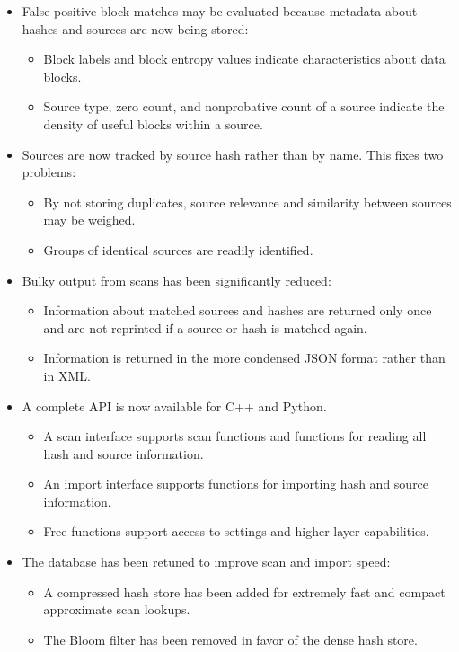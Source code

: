 \documentclass[11pt,fleqn]{article} %
\begin{document}
\begin{itemize}
\item False positive block matches may be evaluated because metadata about hashes and sources are now being stored:
  \begin{itemize}
  \item Block labels and block entropy values indicate characteristics about data blocks.
  \item Source type, zero count, and nonprobative count of a source indicate the density of useful blocks within a source.
\end{itemize}
\item Sources are now tracked by source hash rather than by name.  This fixes two problems:
  \begin{itemize}
  \item By not storing duplicates, source relevance and similarity between sources may be weighed.
  \item Groups of identical sources are readily identified.
  \end{itemize}
\item Bulky output from scans has been significantly reduced:
  \begin{itemize}
  \item Information about matched sources and hashes are returned only once and are not reprinted if a source or hash is matched again.
  \item Information is returned in the more condensed JSON format rather than in XML.
  \end{itemize}
\item A complete \hdb API is now available for C++ and Python.
  \begin{itemize}
  \item A scan interface supports scan functions and functions for reading all hash and source information.
  \item An import interface supports functions for importing hash and source information.
  \item Free functions support access to settings and higher-layer capabilities.
  \end{itemize}
\item The database has been retuned to improve scan and import speed:
  \begin{itemize}
  \item A compressed hash store has been added for extremely fast and compact approximate scan lookups.
  \item The Bloom filter has been removed in favor of the dense hash store.

\end{itemize}
\end{itemize}
\end{document}
